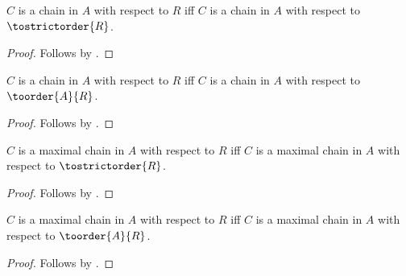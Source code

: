 \begin{proposition}\label{chain_tostrictorder_iff}
    $C$ is a chain in $A$ with respect to $R$ iff
        $C$ is a chain in $A$ with respect to $\tostrictorder{R}$.
\end{proposition}
\begin{proof}
    Follows by .
\end{proof}

\begin{proposition}\label{chain_toorder_iff}
    $C$ is a chain in $A$ with respect to $R$ iff
        $C$ is a chain in $A$ with respect to $\toorder{A}{R}$.
\end{proposition}
\begin{proof}
    Follows by .
\end{proof}

\begin{proposition}\label{maximal_chain_tostrictorder_iff}
    $C$ is a maximal chain in $A$ with respect to $R$ iff
        $C$ is a maximal chain in $A$ with respect to $\tostrictorder{R}$.
\end{proposition}
\begin{proof}
    Follows by .
\end{proof}

\begin{proposition}\label{maximal_chain_toorder_iff}
    $C$ is a maximal chain in $A$ with respect to $R$ iff
        $C$ is a maximal chain in $A$ with respect to $\toorder{A}{R}$.
\end{proposition}
\begin{proof}
    Follows by .
\end{proof}

